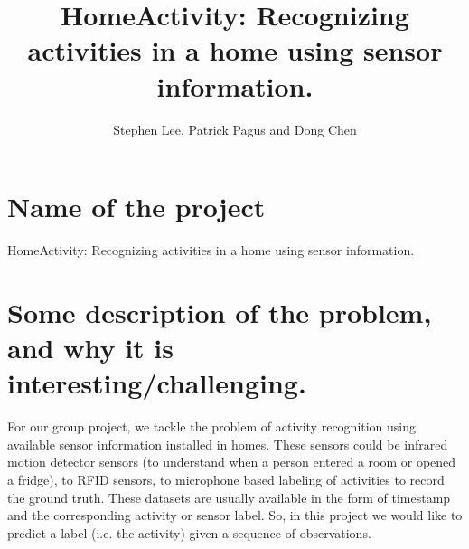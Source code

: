 \documentclass[11pt, oneside]{article}   	%
\title{HomeActivity: Recognizing activities in a home using sensor information. }
\author{Stephen Lee, Patrick Pagus and Dong Chen}
\begin{document}
\maketitle
\section{Name of the project}
HomeActivity: Recognizing activities in a home using sensor information. 

\section{Some description of the problem, and why it is interesting/challenging.}
For our group project, we tackle the problem of activity recognition using available sensor information installed in homes. 
These sensors could be infrared motion detector sensors (to understand when a person entered a room or opened a fridge),
to RFID sensors, to microphone based labeling of activities to record the ground truth. These datasets 
are usually available in the form of timestamp and the corresponding activity or sensor label. 
So, in this project we would like to predict a label (i.e. the activity) given a sequence of observations. 
\end{document}

